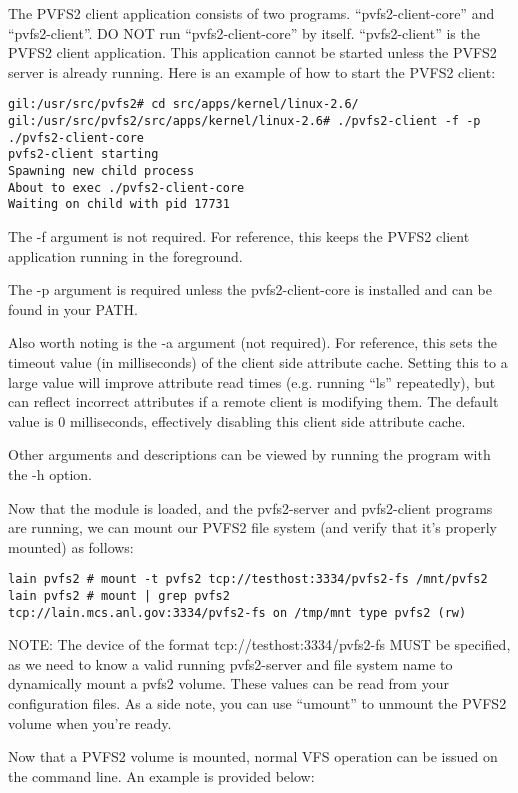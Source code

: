 \documentclass[11pt, letterpaper]{article}
\begin{document}
The PVFS2 client application consists of two programs.
``pvfs2-client-core'' and ``pvfs2-client''.  DO NOT run
``pvfs2-client-core'' by itself.  ``pvfs2-client'' is the PVFS2 client
application.  This application cannot be started unless the PVFS2
server is already running.  Here is an example of how to start the
PVFS2 client:

\begin{verbatim}
gil:/usr/src/pvfs2# cd src/apps/kernel/linux-2.6/
gil:/usr/src/pvfs2/src/apps/kernel/linux-2.6# ./pvfs2-client -f -p ./pvfs2-client-core
pvfs2-client starting
Spawning new child process
About to exec ./pvfs2-client-core
Waiting on child with pid 17731
\end{verbatim}

The -f argument is not required.  For reference, this keeps the PVFS2
client application running in the foreground.

The -p argument is required unless the pvfs2-client-core is installed
and can be found in your PATH.

Also worth noting is the -a argument (not required).  For reference,
this sets the timeout value (in milliseconds) of the client side
attribute cache.  Setting this to a large value will improve attribute
read times (e.g. running ``ls'' repeatedly), but can reflect incorrect
attributes if a remote client is modifying them.  The default value is
0 milliseconds, effectively disabling this client side attribute
cache.

Other arguments and descriptions can be viewed by running the program
with the -h option.

Now that the module is loaded, and the pvfs2-server and pvfs2-client
programs are running, we can mount our PVFS2 file system (and verify
that it's properly mounted) as follows:

\begin{verbatim}
lain pvfs2 # mount -t pvfs2 tcp://testhost:3334/pvfs2-fs /mnt/pvfs2
lain pvfs2 # mount | grep pvfs2
tcp://lain.mcs.anl.gov:3334/pvfs2-fs on /tmp/mnt type pvfs2 (rw)
\end{verbatim}

NOTE: The device of the format tcp://testhost:3334/pvfs2-fs MUST be
specified, as we need to know a valid running pvfs2-server and file
system name to dynamically mount a pvfs2 volume.  These values can be
read from your configuration files.  As a side note, you can use
``umount'' to unmount the PVFS2 volume when you're ready.

Now that a PVFS2 volume is mounted, normal VFS operation can be issued
on the command line.  An example is provided below:
\end{document}
